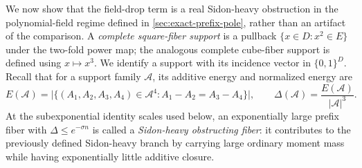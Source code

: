 \documentclass[12pt,a4paper]{amsart}
\numberwithin{equation}{section}
\theoremstyle{remark}
\newcommand{\abs}[1]{\lvert #1\rvert}
\begin{document}
We now show that the field-drop term is a real Sidon-heavy obstruction in
the polynomial-field regime defined in \cref{sec:exact-prefix-pole}, rather
than an artifact of the comparison.  A
\emph{complete square-fiber support} is a pullback
\(\{x\in D:x^2\in E\}\) under the two-fold power map; the analogous
complete cube-fiber support is defined using \(x\mapsto x^3\).
We identify a support with its incidence vector in \(\{0,1\}^D\).
Recall that for a support family \(\mathcal A\), its additive energy and
normalized energy are
\[
 E(\mathcal A)
 =\abs{\{(A_1,A_2,A_3,A_4)\in\mathcal A^4:
                 A_1-A_2=A_3-A_4\}},
 \qquad
 \Delta(\mathcal A)=\frac{E(\mathcal A)}{\abs{\mathcal A}^3}.
\]
At the subexponential identity scales used below, an exponentially large
prefix fiber with \(\Delta\le e^{-\sigma n}\) is called a
\emph{Sidon-heavy obstructing fiber}: it contributes to the previously
defined Sidon-heavy branch by carrying large ordinary moment mass while
having exponentially little additive closure.
\end{document}
